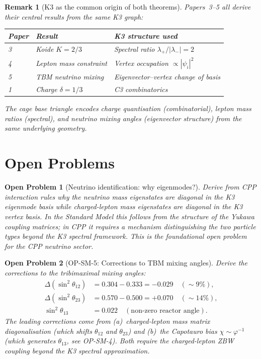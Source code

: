 \documentclass[11pt]{article}
\newtheorem{remark}{Remark}[section]
\newtheorem{openproblem}{Open Problem}
\newcommand{\phig}{\varphi}
\begin{document}
\begin{remark}[K3 as the common origin of both theorems]
Papers~3--5 all derive their central results from the same K3 graph:

\begin{center}
\renewcommand{\arraystretch}{1.3}
\begin{tabular}{lll}
\toprule
Paper & Result & K3 structure used \\
\midrule
3 & Koide $K = 2/3$ & Spectral ratio $\lambda_+/|\lambda_-| = 2$ \\
4 & Lepton mass constraint & Vertex occupation $\propto |\psi_i|^2$ \\
5 & TBM neutrino mixing & Eigenvector--vertex change of basis \\
\midrule
1 & Charge $\delta = 1/3$ & C3 combinatorics \\
\bottomrule
\end{tabular}
\end{center}

The cage base triangle encodes charge quantisation (combinatorial),
lepton mass ratios (spectral), and neutrino mixing angles
(eigenvector structure) from the same underlying geometry.
\end{remark}

\section{Open Problems}

\begin{openproblem}[Neutrino identification: why eigenmodes?]
\label{op:nu_id}
Derive from CPP interaction rules why the neutrino mass eigenstates
are diagonal in the K3 eigenmode basis while charged-lepton mass
eigenstates are diagonal in the K3 vertex basis.  In the Standard
Model this follows from the structure of the Yukawa coupling matrices;
in CPP it requires a mechanism distinguishing the two particle types
beyond the K3 spectral framework.  This is the foundational open
problem for the CPP neutrino sector.
\end{openproblem}

\begin{openproblem}[OP-SM-5: Corrections to TBM mixing angles]
\label{op:corrections}
Derive the corrections to the tribimaximal mixing angles:
\begin{align*}
\Delta(\sin^2\theta_{12}) &= 0.304 - 0.333 = -0.029 \quad (\sim 9\%), \\
\Delta(\sin^2\theta_{23}) &= 0.570 - 0.500 = +0.070 \quad (\sim 14\%), \\
\sin^2\theta_{13} &= 0.022 \quad (\text{non-zero reactor angle}).
\end{align*}
The leading corrections come from (a)~charged-lepton mass matrix
diagonalisation (which shifts $\theta_{12}$ and $\theta_{23}$) and
(b)~the Capotauro bias $\chi \sim \phig^{-1}$ (which generates
$\theta_{13}$, see OP-SM-4).  Both require the charged-lepton ZBW
coupling beyond the K3 spectral approximation.
\end{openproblem}
\end{document}
